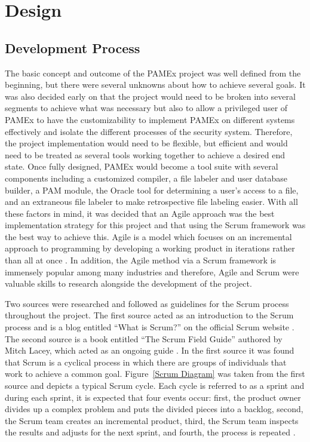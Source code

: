 \section{Design}
\label{sec:DesignImplementation}
\vspace{\baselineskip}
\subsection{Development Process} 
\par 
\vspace{\baselineskip}
\hspace{1em}
The basic concept and outcome of the PAMEx project was well defined 
from the beginning, but there were several unknowns about how to 
achieve several goals. It was also decided early on that the project 
would need to be broken into several segments to achieve what was 
necessary but also to allow a privileged user of PAMEx to have the 
customizability to implement PAMEx on different systems effectively 
and isolate the different processes of the security system. Therefore, 
the project implementation would need to be flexible, but efficient 
and would need to be treated as several tools working together to 
achieve a desired end state. Once fully designed, PAMEx would become a tool 
suite with several components including a customized compiler, a file 
labeler and user database builder, a PAM module, the Oracle tool for 
determining a user’s access to a file, and an extraneous file labeler 
to make retrospective file labeling easier. With all these factors in 
mind, it was decided that an Agile approach was the best implementation 
strategy for this project and that using the Scrum framework was the 
best way to achieve this. Agile is a model which focuses on an incremental approach to 
programming by developing a working product in iterations rather than all at once \cite{kung2014}. 
In addition, the Agile method via a Scrum 
framework is immensely popular among many industries \cite{lacey2015} and therefore, 
Agile and Scrum were valuable skills to research 
alongside the development of the project. 

Two sources were researched and followed as guidelines for the 
Scrum process throughout the project. The first source 
acted as an introduction to the Scrum process and is a blog entitled 
“What is Scrum?” on the official Scrum website \cite{scrumorg}. The second 
source is a book entitled “The Scrum Field Guide” authored by 
Mitch Lacey, which acted as an ongoing guide \cite{lacey2015}. In the first source it was found that Scrum is a cyclical process in which there are groups of 
individuals that work to achieve a common goal. Figure~\ref{Scrum Diagram}
was taken from the first source and depicts a typical Scrum cycle. Each cycle is referred to as a sprint 
and during each sprint, it is expected that four events occur: first, 
the product owner divides up a complex problem and puts the divided 
pieces into a backlog, second, the Scrum team creates an incremental 
product, third, the Scrum team inspects the results and adjusts for 
the next sprint, and fourth, the process is repeated \cite{scrumorg}.
\clearpage

